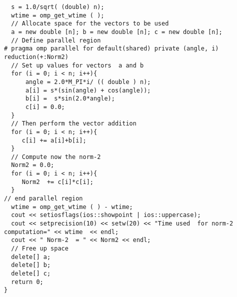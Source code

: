 \documentclass{beamer}
\begin{document}
\begin{frame}
\begin{verbatim}
  s = 1.0/sqrt( (double) n);
  wtime = omp_get_wtime ( );
  // Allocate space for the vectors to be used
  a = new double [n]; b = new double [n]; c = new double [n];
  // Define parallel region
# pragma omp parallel for default(shared) private (angle, i) reduction(+:Norm2)
  // Set up values for vectors  a and b
  for (i = 0; i < n; i++){
      angle = 2.0*M_PI*i/ (( double ) n);
      a[i] = s*(sin(angle) + cos(angle));
      b[i] =  s*sin(2.0*angle);
      c[i] = 0.0;
  }
  // Then perform the vector addition
  for (i = 0; i < n; i++){
     c[i] += a[i]+b[i];
  }
  // Compute now the norm-2
  Norm2 = 0.0;
  for (i = 0; i < n; i++){
     Norm2  += c[i]*c[i];
  }
// end parallel region
  wtime = omp_get_wtime ( ) - wtime;
  cout << setiosflags(ios::showpoint | ios::uppercase);
  cout << setprecision(10) << setw(20) << "Time used  for norm-2 computation=" << wtime  << endl;
  cout << " Norm-2  = " << Norm2 << endl;
  // Free up space
  delete[] a;
  delete[] b;
  delete[] c;
  return 0;
}

\end{verbatim}
\end{frame}
\end{document}

